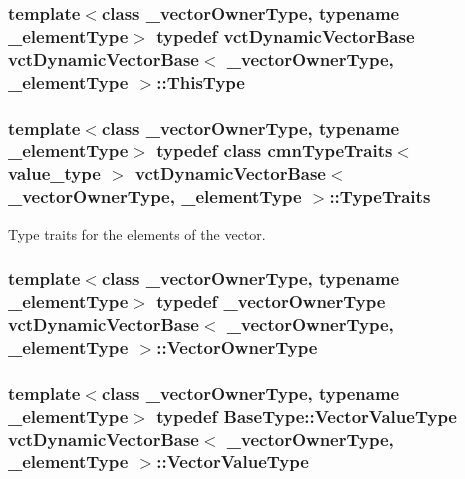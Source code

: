 \hypertarget{classvct_dynamic_vector_base_ae4c00cc291df57593d6a73c838ae897a}{
\subsubsection[{This\-Type}]{\setlength{\rightskip}{0pt plus 5cm}template$<$class \-\_\-vector\-Owner\-Type, typename \-\_\-element\-Type$>$ typedef {\bf vct\-Dynamic\-Vector\-Base} {\bf vct\-Dynamic\-Vector\-Base}$<$ \-\_\-vector\-Owner\-Type, \-\_\-element\-Type $>$\-::{\bf This\-Type}}}\label{classvct_dynamic_vector_base_ae4c00cc291df57593d6a73c838ae897a}
\hypertarget{classvct_dynamic_vector_base_ae5ebb885e67454fa18cb8101f1acc8dd}{
\subsubsection[{Type\-Traits}]{\setlength{\rightskip}{0pt plus 5cm}template$<$class \-\_\-vector\-Owner\-Type, typename \-\_\-element\-Type$>$ typedef class {\bf cmn\-Type\-Traits}$<$ value\-\_\-type $>$ {\bf vct\-Dynamic\-Vector\-Base}$<$ \-\_\-vector\-Owner\-Type, \-\_\-element\-Type $>$\-::{\bf Type\-Traits}}}\label{classvct_dynamic_vector_base_ae5ebb885e67454fa18cb8101f1acc8dd}
Type traits for the elements of the vector. \hypertarget{classvct_dynamic_vector_base_a563d79f5b4dd71f037192fe2961b48eb}{
\subsubsection[{Vector\-Owner\-Type}]{\setlength{\rightskip}{0pt plus 5cm}template$<$class \-\_\-vector\-Owner\-Type, typename \-\_\-element\-Type$>$ typedef \-\_\-vector\-Owner\-Type {\bf vct\-Dynamic\-Vector\-Base}$<$ \-\_\-vector\-Owner\-Type, \-\_\-element\-Type $>$\-::{\bf Vector\-Owner\-Type}}}\label{classvct_dynamic_vector_base_a563d79f5b4dd71f037192fe2961b48eb}
\hypertarget{classvct_dynamic_vector_base_ad3db797a792ca2ced6433a42b0fa54d6}{
\subsubsection[{Vector\-Value\-Type}]{\setlength{\rightskip}{0pt plus 5cm}template$<$class \-\_\-vector\-Owner\-Type, typename \-\_\-element\-Type$>$ typedef {\bf Base\-Type\-::\-Vector\-Value\-Type} {\bf vct\-Dynamic\-Vector\-Base}$<$ \-\_\-vector\-Owner\-Type, \-\_\-element\-Type $>$\-::{\bf Vector\-Value\-Type}}}\label{classvct_dynamic_vector_base_ad3db797a792ca2ced6433a42b0fa54d6}


